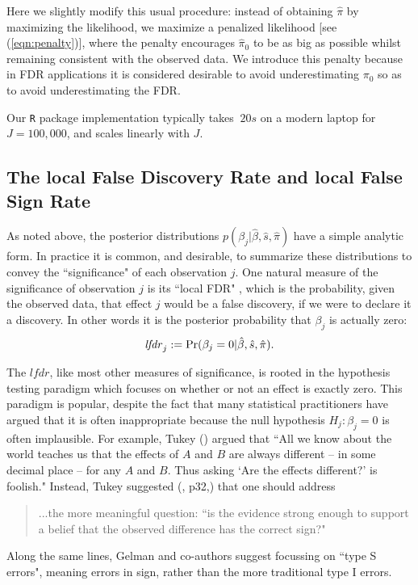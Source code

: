 \documentclass[11pt]{article}
\def\lfdr{\textit{lfdr}}
\def\bhat{\hat{\beta}}
\def\shat{\hat{s}}
\begin{document}
Here we slightly modify this usual procedure: instead of obtaining $\hat\pi$ by maximizing the likelihood, we maximize a penalized
likelihood [see (\ref{eqn:penalty})], where the penalty encourages $\hat\pi_0$ to be as big as possible whilst remaining consistent with the observed data. 
We introduce this penalty because in FDR applications it is considered desirable to avoid underestimating $\pi_0$ so as to avoid underestimating the FDR. 

Our {\tt R} package implementation typically takes $~20s$ on a modern laptop for $J=100,000$, and scales linearly with $J$. 

\subsection*{The local False Discovery Rate and local False Sign Rate}

As noted above, the posterior distributions $p(\beta_j | \bhat, \shat, \hat{\pi})$ have a simple analytic form.
In practice it is common, and desirable, to summarize these distributions to convey the ``significance" of each observation $j$.
One natural measure of the significance of observation $j$ is its ``local FDR" \cite{efron2008microarrays}, which is
the probability, given the observed data, that effect $j$ would be a false discovery, if we were to declare it a discovery.
In other words it is the posterior probability that $\beta_j$ is actually zero:
\begin{equation} \label{eqn:fdr}
\fdr_j := \Pr(\beta_j =0  |  \bhat, \shat, \hat{\pi}).
\end{equation}

The $\lfdr$, like most other measures of significance, is rooted in the hypothesis testing paradigm which focuses on 
whether or not an effect is exactly zero. This paradigm is popular, despite the fact that many statistical practitioners have argued that it is often inappropriate because
the null hypothesis $H_j: \beta_j=0$ is often implausible. For example, Tukey  (\cite{tukey1991philosophy}) argued that
``All we know about the world teaches us that the effects of $A$ and $B$ are always different -- in some decimal place -- for any $A$ and $B$. Thus asking `Are the effects different?' is foolish." Instead, Tukey suggested (\cite{tukey1962future}, p32,) that one should address
\begin{quote}
...the more meaningful question: ``is the evidence strong enough to support a belief that the observed difference has the correct sign?"
\end{quote}
Along the same lines, Gelman and co-authors \cite{gelman2000type, gelman2012we} suggest  
focussing on ``type S errors", meaning errors in sign, rather than the more traditional type I errors.
\end{document}
